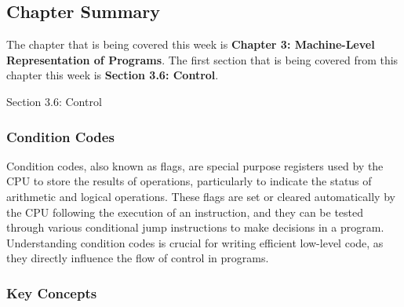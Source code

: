 \subsection{Chapter Summary}

The chapter that is being covered this week is \textbf{Chapter 3: Machine-Level Representation of Programs}. The first section that is being covered from this chapter this week is \textbf{Section 3.6: Control}.

\begin{notes}{Section 3.6: Control}
    \subsubsection*{Condition Codes}

    Condition codes, also known as flags, are special purpose registers used by the CPU to store the results of operations, particularly to indicate the status of arithmetic and logical operations. 
    These flags are set or cleared automatically by the CPU following the execution of an instruction, and they can be tested through various conditional jump instructions to make decisions in a 
    program. Understanding condition codes is crucial for writing efficient low-level code, as they directly influence the flow of control in programs. \vspace*{1em}
    
    \subsubsection*{Key Concepts}
    

\end{notes}
